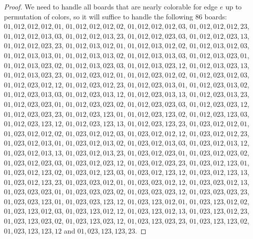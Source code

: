 \documentclass[12pt]{article}
\begin{document}
\begin{proof}
We need to handle all boards that are nearly colorable for edge $e$ up to permutation of colors, so it will suffice to handle the following 86 boards: $01,012,012,012,01$, $01,012,012,012,02$, $01,012,012,012,03$, $01,012,012,012,23$, $01,012,012,013,03$, $01,012,012,013,23$, $01,012,012,023,03$, $01,012,012,023,13$, $01,012,012,023,23$, $01,012,013,012,01$, $01,012,013,012,02$, $01,012,013,012,03$, $01,012,013,013,01$, $01,012,013,013,02$, $01,012,013,013,03$, $01,012,013,023,01$, $01,012,013,023,02$, $01,012,013,023,03$, $01,012,013,023,12$, $01,012,013,023,13$, $01,012,013,023,23$, $01,012,023,012,01$, $01,012,023,012,02$, $01,012,023,012,03$, $01,012,023,012,12$, $01,012,023,012,23$, $01,012,023,013,01$, $01,012,023,013,02$, $01,012,023,013,03$, $01,012,023,013,12$, $01,012,023,013,13$, $01,012,023,013,23$, $01,012,023,023,01$, $01,012,023,023,02$, $01,012,023,023,03$, $01,012,023,023,12$, $01,012,023,023,23$, $01,012,023,123,01$, $01,012,023,123,02$, $01,012,023,123,03$, $01,012,023,123,12$, $01,012,023,123,13$, $01,012,023,123,23$, $01,023,012,012,01$, $01,023,012,012,02$, $01,023,012,012,03$, $01,023,012,012,12$, $01,023,012,012,23$, $01,023,012,013,01$, $01,023,012,013,02$, $01,023,012,013,03$, $01,023,012,013,12$, $01,023,012,013,13$, $01,023,012,013,23$, $01,023,012,023,01$, $01,023,012,023,02$, $01,023,012,023,03$, $01,023,012,023,12$, $01,023,012,023,23$, $01,023,012,123,01$, $01,023,012,123,02$, $01,023,012,123,03$, $01,023,012,123,12$, $01,023,012,123,13$, $01,023,012,123,23$, $01,023,023,012,01$, $01,023,023,012,12$, $01,023,023,012,13$, $01,023,023,023,01$, $01,023,023,023,02$, $01,023,023,023,12$, $01,023,023,023,23$, $01,023,023,123,01$, $01,023,023,123,12$, $01,023,123,012,01$, $01,023,123,012,02$, $01,023,123,012,03$, $01,023,123,012,12$, $01,023,123,012,13$, $01,023,123,012,23$, $01,023,123,023,02$, $01,023,123,023,12$, $01,023,123,023,23$, $01,023,123,123,02$, $01,023,123,123,12$ and $01,023,123,123,23$.



\end{proof}
\end{document}
